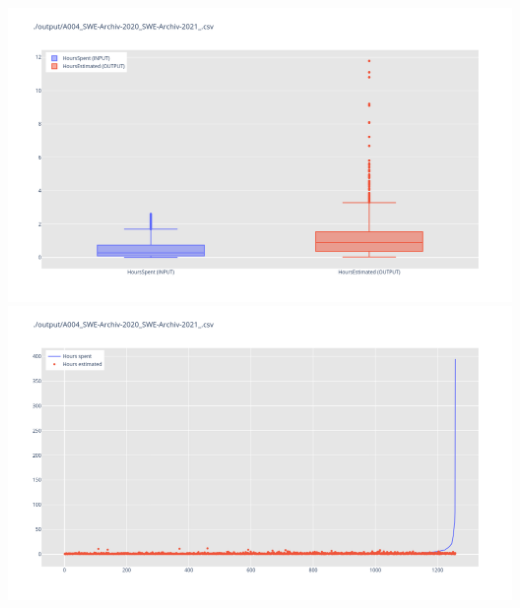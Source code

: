 \includegraphics[width=\textwidth]{Scripts/output/A004_SWE-Archiv-2020_SWE-Archiv-2021_.csv.png}
\includegraphics[width=\textwidth]{Scripts/output/A004_SWE-Archiv-2020_SWE-Archiv-2021_.csv.scatter.png}
